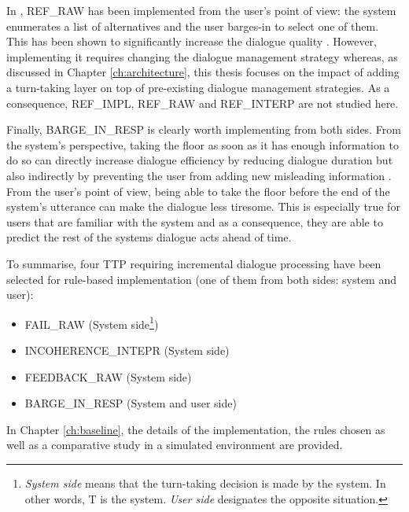 				In \cite{El-Asri2014a}, REF\_RAW has been implemented from the user's point of view: the system enumerates a list of alternatives and the user barges-in to select one of them. This has been shown to significantly increase the dialogue quality \cite{El-Asri2014c}. However, implementing it requires changing the dialogue management strategy whereas, as discussed in Chapter \ref{ch:architecture}, this thesis focuses on the impact of adding a turn-taking layer on top of pre-existing dialogue management strategies. As a consequence, REF\_IMPL, REF\_RAW and REF\_INTERP are not studied here.

				Finally, BARGE\_IN\_RESP is clearly worth implementing from both sides. From the system's perspective, taking the floor as soon as it has enough information to do so can directly increase dialogue efficiency by reducing dialogue duration but also indirectly by preventing the user from adding new misleading information \cite{Ghigi2014}. From the user's point of view, being able to take the floor before the end of the system's utterance can make the dialogue less tiresome. This is especially true for users that are familiar with the system and as a consequence, they are able to predict the rest of the systems dialogue acts ahead of time.

				To summarise, four TTP requiring incremental dialogue processing have been selected for rule-based implementation (one of them from both sides: system and user):
				\begin{itemize}
					\item FAIL\_RAW (System side\footnote{\textit{System side} means that the turn-taking decision is made by the system. In other words, T is the system. \textit{User side} designates the opposite situation.})
					\item INCOHERENCE\_INTEPR (System side)
					\item FEEDBACK\_RAW (System side)
					\item BARGE\_IN\_RESP (System and user side)
				\end{itemize}

				In Chapter \ref{ch:baseline}, the details of the implementation, the rules chosen as well as a comparative study in a simulated environment are provided.
